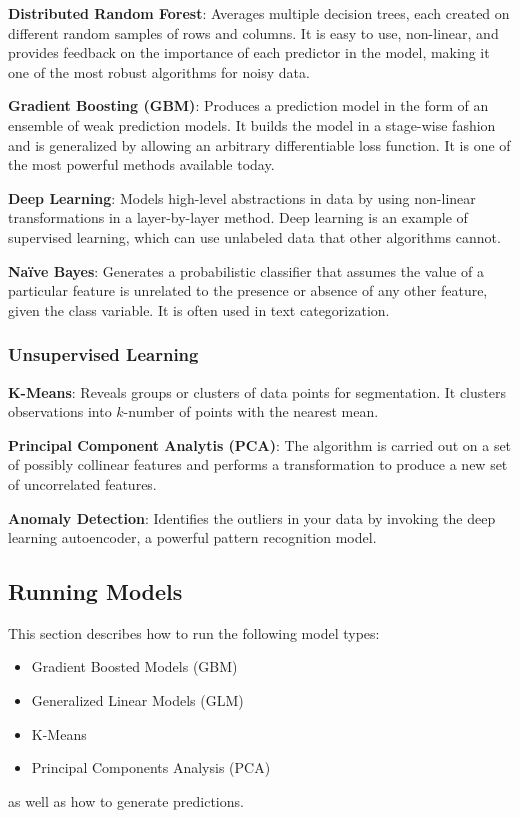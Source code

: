 {\textbf{Distributed Random Forest}}: Averages multiple decision trees, each created on different random samples of rows and columns. It is easy to use, non-linear, and provides feedback on the importance of each predictor in the model, making it one of the most robust algorithms for noisy data.

{\textbf{Gradient Boosting (GBM)}}: Produces a prediction model in the form of an ensemble of weak prediction models. It builds the model in a stage-wise fashion and is generalized by allowing an arbitrary differentiable loss function. It is one of the most powerful methods available today.

{\textbf{Deep Learning}}: Models high-level abstractions in data by using non-linear transformations in a layer-by-layer method. Deep learning is an example of supervised learning, which can use unlabeled data that other algorithms cannot.

{\textbf{Na\"{i}ve Bayes}}: Generates a probabilistic classifier that assumes the value of a particular feature is unrelated to the presence or absence of any other feature, given the class variable. It is often used in text categorization.

\subsubsection{Unsupervised Learning}
{\textbf{K-Means}}: Reveals groups or clusters of data points for segmentation. It clusters observations into $k$-number of points with the nearest mean.

{\textbf{Principal Component Analytis (PCA)}}: The algorithm is carried out on a set of possibly collinear features and performs a transformation to produce a new set of uncorrelated features.

{\textbf{Anomaly Detection}}: Identifies the outliers in your data by invoking the deep learning autoencoder, a powerful pattern recognition model.

\subsection{Running Models}
This section describes how to run the following model types:

\begin{itemize}
\item Gradient Boosted Models (GBM)
\item Generalized Linear Models (GLM)
\item K-Means
\item Principal Components Analysis (PCA)

\end{itemize}
as well as how to generate predictions.

